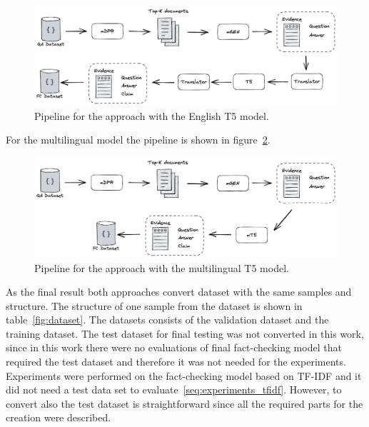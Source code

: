 \begin{figure}[H]
    \centering
    \includegraphics[scale=0.3]{figures/T5.png}
    \caption{Pipeline for the approach with the English T5 model.}
    \label{fig:t5}
\end{figure}

\noindent For the multilingual model the pipeline is shown in figure~\ref{fig:mt5}. 

\begin{figure}[H]
    \centering
    \includegraphics[scale=0.3]{figures/mT5.png}
    \caption{Pipeline for the approach with the multilingual T5 model.}
    \label{fig:mt5}
\end{figure}

As the final result both approaches convert dataset with the same samples and structure. The structure of one sample from the dataset is shown in table~\ref{fig:dataset}. The datasets consists of the validation dataset and the training dataset. The test dataset for final testing was not converted in this work, since in this work there were no evaluations of final fact-checking model that required the test dataset and therefore it was not needed for the experiments. Experiments were performed on the fact-checking model based on TF-IDF and it did not need a test data set to evaluate~\ref{seq:experiments_tfidf}. However, to convert also the test dataset is straightforward since all the required parts for the creation were described.

